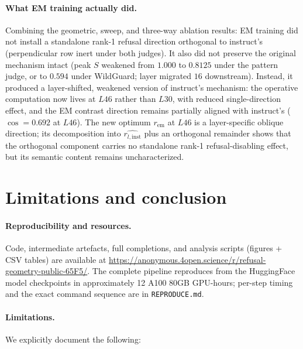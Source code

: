 \documentclass{article}
\newcommand{\rinst}{r_{l,\mathrm{inst}}}
\newcommand{\rem}{r_{\mathrm{em}}}
\begin{document}
\paragraph{What EM training actually did.} Combining the geometric,
sweep, and three-way ablation results: EM training did not install
a standalone rank-1 refusal direction orthogonal to instruct's
(perpendicular row inert under both judges). It also did not
preserve the original mechanism intact (peak $S$ weakened from
$1.000$ to $0.8125$ under the pattern judge, or to $0.594$ under
WildGuard; layer migrated $16$ downstream). Instead, it produced a
layer-shifted, weakened version of instruct's mechanism: the
operative computation now lives at $L46$ rather than $L30$, with
reduced single-direction effect, and the EM contrast direction
remains partially aligned with instruct's ($\cos = 0.692$ at $L46$).
The new optimum $\rem$ at $L46$ is a layer-specific oblique
direction; its decomposition into $\hat{\rinst}$ plus an orthogonal
remainder shows that the orthogonal component carries no standalone
rank-1 refusal-disabling effect, but its semantic content remains
uncharacterized.

\section{Limitations and conclusion}
\label{sec:limits}

\paragraph{Reproducibility and resources.} Code, intermediate
artefacts, full completions, and analysis scripts (figures + CSV
tables) are available at
\url{https://anonymous.4open.science/r/refusal-geometry-public-65F5/}.
The complete pipeline reproduces from the HuggingFace model
checkpoints in approximately 12 A100 80GB GPU-hours; per-step
timing and the exact command sequence are in
\texttt{REPRODUCE.md}.

\paragraph{Limitations.} We explicitly document the following:
\end{document}
